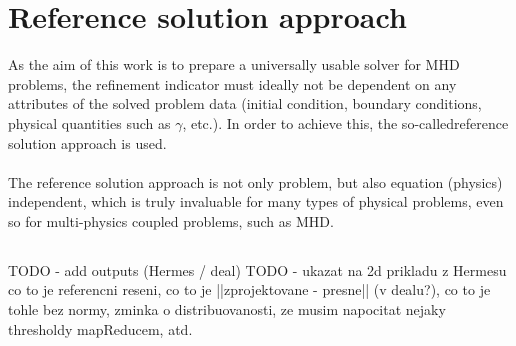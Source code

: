 \section{Reference solution approach}
As the aim of this work is to prepare a universally usable solver for MHD problems, the refinement indicator  must ideally not be dependent on any attributes of the solved problem data (initial condition, boundary conditions, physical quantities such as $\gamma$, etc.). In order to achieve this, the so-called{reference solution} approach is used.
\paragraph{}
The reference solution approach is not only problem, but also equation (physics) independent, which is truly invaluable for many types of physical problems, even so for multi-physics coupled problems, such as MHD.
\subsection{}
TODO - add outputs (Hermes / deal)
TODO - ukazat na 2d prikladu z Hermesu co to je referencni reseni, co to je ||zprojektovane - presne|| (v dealu?), co to je tohle bez normy, zminka o distribuovanosti, ze musim napocitat nejaky thresholdy mapReducem, atd.

